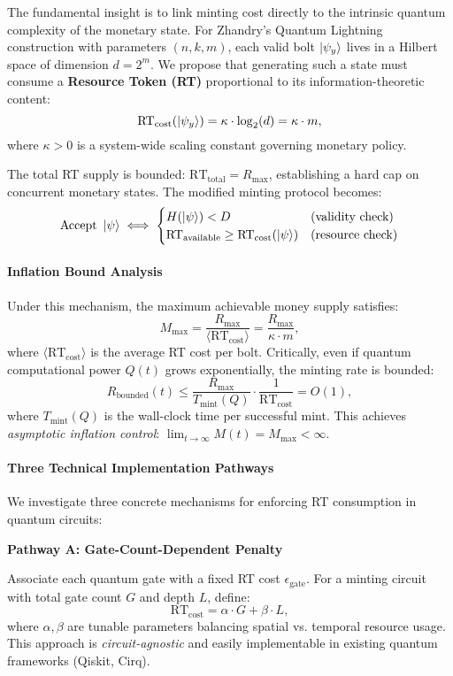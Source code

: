 \documentclass[a4paper,10.5pt,twoside]{article}
\begin{document}
The fundamental insight is to link minting cost directly to the intrinsic quantum complexity of the monetary state.  
For Zhandry's Quantum Lightning construction with parameters $(n, k, m)$, each valid bolt $\ket{\psi_y}$ lives in a Hilbert space of dimension $d = 2^m$.  
We propose that generating such a state must consume a \textbf{Resource Token (RT)} proportional to its information-theoretic content:
\[
\text{RT}_{\text{cost}}(\ket{\psi_y}) = \kappa \cdot \log_2(d) = \kappa \cdot m,
\]
where $\kappa > 0$ is a system-wide scaling constant governing monetary policy.

The total RT supply is bounded: $\text{RT}_{\text{total}} = R_{\max}$, establishing a hard cap on concurrent monetary states.  
The modified minting protocol becomes:
\[
\text{Accept } \ket{\psi} \iff \begin{cases}
H(\ket{\psi}) < D & \text{(validity check)} \\
\text{RT}_{\text{available}} \geq \text{RT}_{\text{cost}}(\ket{\psi}) & \text{(resource check)}
\end{cases}
\]

\paragraph{Inflation Bound Analysis}

Under this mechanism, the maximum achievable money supply satisfies:
\[
M_{\max} = \frac{R_{\max}}{\langle \text{RT}_{\text{cost}} \rangle} = \frac{R_{\max}}{\kappa \cdot m},
\]
where $\langle \text{RT}_{\text{cost}} \rangle$ is the average RT cost per bolt.  
Critically, even if quantum computational power $Q(t)$ grows exponentially, the minting rate is bounded:
\[
R_{\text{bounded}}(t) \leq \frac{R_{\max}}{T_{\text{mint}}(Q)} \cdot \frac{1}{\text{RT}_{\text{cost}}} = O(1),
\]
where $T_{\text{mint}}(Q)$ is the wall-clock time per successful mint.  
This achieves \textit{asymptotic inflation control}: $\lim_{t \to \infty} M(t) = M_{\max} < \infty$.

\paragraph{Three Technical Implementation Pathways}

We investigate three concrete mechanisms for enforcing RT consumption in quantum circuits:

\textbf{Pathway A: Gate-Count-Dependent Penalty}

Associate each quantum gate with a fixed RT cost $\epsilon_{\text{gate}}$.  
For a minting circuit with total gate count $G$ and depth $L$, define:
\[
\text{RT}_{\text{cost}} = \alpha \cdot G + \beta \cdot L,
\]
where $\alpha, \beta$ are tunable parameters balancing spatial vs. temporal resource usage.  
This approach is \textit{circuit-agnostic} and easily implementable in existing quantum frameworks (Qiskit, Cirq).
\end{document}
